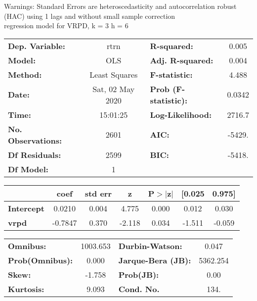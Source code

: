 Warnings: \newline
 [1] Standard Errors are heteroscedasticity and autocorrelation robust (HAC) using 1 lags and without small sample correction\\ 

regression model for VRPD, k = 3 h = 6\begin{center}
\begin{tabular}{lclc}
\toprule
\textbf{Dep. Variable:}    &       rtrn       & \textbf{  R-squared:         } &     0.005   \\
\textbf{Model:}            &       OLS        & \textbf{  Adj. R-squared:    } &     0.004   \\
\textbf{Method:}           &  Least Squares   & \textbf{  F-statistic:       } &     4.488   \\
\textbf{Date:}             & Sat, 02 May 2020 & \textbf{  Prob (F-statistic):} &   0.0342    \\
\textbf{Time:}             &     15:01:25     & \textbf{  Log-Likelihood:    } &    2716.7   \\
\textbf{No. Observations:} &        2601      & \textbf{  AIC:               } &    -5429.   \\
\textbf{Df Residuals:}     &        2599      & \textbf{  BIC:               } &    -5418.   \\
\textbf{Df Model:}         &           1      & \textbf{                     } &             \\
\bottomrule
\end{tabular}
\begin{tabular}{lcccccc}
                   & \textbf{coef} & \textbf{std err} & \textbf{z} & \textbf{P$> |$z$|$} & \textbf{[0.025} & \textbf{0.975]}  \\
\midrule
\textbf{Intercept} &       0.0210  &        0.004     &     4.775  &         0.000        &        0.012    &        0.030     \\
\textbf{vrpd}      &      -0.7847  &        0.370     &    -2.118  &         0.034        &       -1.511    &       -0.059     \\
\bottomrule
\end{tabular}
\begin{tabular}{lclc}
\textbf{Omnibus:}       & 1003.653 & \textbf{  Durbin-Watson:     } &    0.047  \\
\textbf{Prob(Omnibus):} &   0.000  & \textbf{  Jarque-Bera (JB):  } & 5362.254  \\
\textbf{Skew:}          &  -1.758  & \textbf{  Prob(JB):          } &     0.00  \\
\textbf{Kurtosis:}      &   9.093  & \textbf{  Cond. No.          } &     134.  \\
\bottomrule
\end{tabular}
\end{center}

